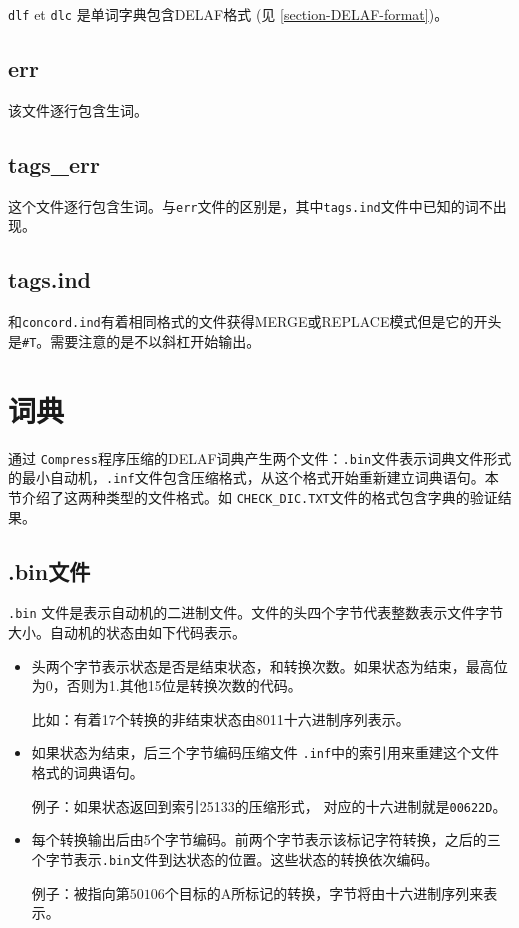 \verb+dlf+ et \verb+dlc+ 是单词字典包含DELAF格式 (见 \ref{section-DELAF-format})。


\subsection{err}
该文件逐行包含生词。

\subsection{tags\_err}
这个文件逐行包含生词。与\verb+err+文件的区别是，其中\verb+tags.ind+文件中已知的词不出现。

\subsection{tags.ind}
\label{section-tags-ind}
和\verb+concord.ind+有着相同格式的文件获得MERGE或REPLACE模式但是它的开头是\verb+#T+。需要注意的是不以斜杠开始输出。



\section{词典}
通过 \verb+Compress+程序压缩的DELAF词典产生两个文件：\verb+.bin+文件表示词典文件形式的最小自动机，\verb+.inf+文件包含压缩格式，从这个格式开始重新建立词典语句。本节介绍了这两种类型的文件格式。如 \verb+CHECK_DIC.TXT+文件的格式包含字典的验证结果。



\subsection{ .bin文件}
 \verb$.bin$ 文件是表示自动机的二进制文件。文件的头四个字节代表整数表示文件字节大小。自动机的状态由如下代码表示。


\begin{itemize}

  \item
  头两个字节表示状态是否是结束状态，和转换次数。如果状态为结束，最高位为0，否则为1.其他15位是转换次数的代码。


  \bigskip 
  比如：有着17个转换的非结束状态由8011十六进制序列表示。


  \bigskip \item 
  如果状态为结束，后三个字节编码压缩文件 \verb+.inf+中的索引用来重建这个文件格式的词典语句。

  \bigskip
  例子：如果状态返回到索引25133的压缩形式，
  对应的十六进制就是\verb+00622D+。
  \bigskip \item
  每个转换输出后由5个字节编码。前两个字节表示该标记字符转换，之后的三个字节表示\verb+.bin+文件到达状态的位置。这些状态的转换依次编码。


  \bigskip
  例子：被指向第$50106$个目标的A所标记的转换，字节将由十六进制序列来表示。

\end{itemize}

